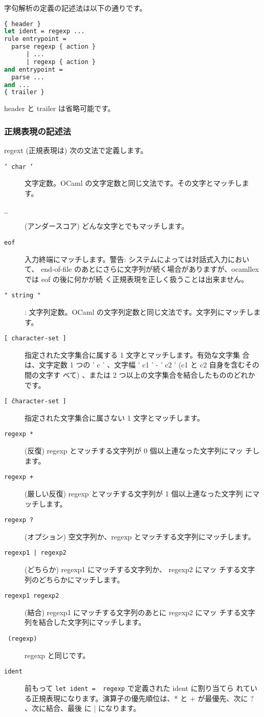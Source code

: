 \documentclass[a4paper,11pt]{jsarticle}
\begin{document}
字句解析の定義の記述法は以下の通りです。

\begin{lstlisting}[language=Caml]
{ header }
let ident = regexp ...
rule entrypoint =
  parse regexp { action }
      | ...
      | regexp { action }
and entrypoint =
  parse ...
and ...
{ trailer }
\end{lstlisting}

header と trailer は省略可能です。

\subsubsection{正規表現の記述法}

regext (正規表現は) 次の文法で定義します。

\begin{description}
\item [\texttt{' char '}] 文字定数。OCaml の文字定数と同じ文法です。その文字とマッチします。
\item [\texttt{\_}] (アンダースコア) どんな文字とでもマッチします。
\item [\texttt{eof}] 入力終端にマッチします。警告: システムによっては対話式入力において、
  end-of-file のあとにさらに文字列が続く場合がありますが、ocamllex では eof の後に何かが続
  く正規表現を正しく扱うことは出来ません。
\item [\texttt{" string "}]: 文字列定数。OCaml の文字列定数と同じ文法です。文字列にマッチします。
\item [\texttt{[ character-set ]}] 指定された文字集合に属する 1 文字とマッチします。有効な文字集
  合は、文字定数 1 つの ' c ' 、文字幅 ' c1 ' - '  c2 ' (c1 と c2 自身を含むその間の文字す
  べて) 、または 2 つ以上の文字集合を結合したもののどれかです。
\item [\texttt{[ \^ character-set ]}] 指定された文字集合に属さない 1 文字とマッチします。
\item [\texttt{regexp *}] (反復) regexp とマッチする文字列が 0 個以上連なった文字列にマッ
  チします。
\item [\texttt{regexp +}] (厳しい反復) regexp とマッチする文字列が 1 個以上連なった文字列
  にマッチします。
\item [\texttt{regexp ?}] (オプション) 空文字列か、regexp とマッチする文字列にマッチします。
\item [\texttt{regexp1 | regexp2}] (どちらか) regexp1 にマッチする文字列か、 regexp2 にマッ
  チする文字列のどちらかにマッチします。
\item [\texttt{regexp1 regexp2}] (結合) regexp1 にマッチする文字列のあとに regexp2 にマッ
  チする文字列を結合した文字列にマッチします。
\item [\texttt{ (regexp) }] regexp と同じです。
\item [\texttt{ident}] 前もって \verb|let ident =  regexp| で定義された ident に割り当てら
  れている正規表現になります。演算子の優先順位は、* と + が最優先、次に ? 、次に結合、最後
  に | になります。
\end{description}
\end{document}
